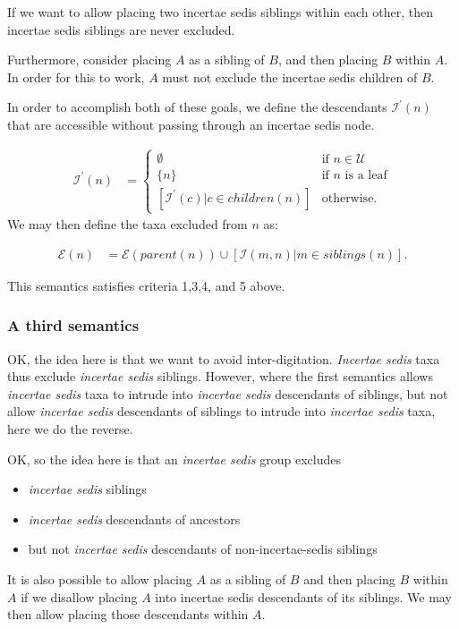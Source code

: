 \documentclass[english]{article}
\begin{document}
If we want to allow placing two incertae sedis siblings within each
other, then incertae sedis siblings are never excluded.

Furthermore, consider placing $A$ as a sibling of $B$, and then
placing $B$ within $A$.
In order for this to work, $A$ must not
exclude the incertae sedis children of $B$.

In order to accomplish both of these goals, we define the descendants
$\mathcal{I}^{\prime}(n)$ that are accessible without passing through
an incertae sedis node.

\begin{align*}
    \mathcal{I^{\prime}}(n) & =
    \begin{cases}
        \emptyset & \text{if }n\in\mathcal{U}\\
        \{n\} & \text{if }n\text{ is a leaf}\\
        [\mathcal{I}^{\prime}(c)|c\in children(n)] & \text{otherwise.}
\end{cases}
\end{align*} We may then define the taxa excluded from $n$
as:

\begin{align*} 
\mathcal{E}(n) & =\mathcal{E}(parent(n))\cup\left[\mathcal{I}(m,n)\big|m\in siblings(n)\right].\label{eq:exclude-set-formula-1}
\end{align*}

This semantics satisfies criteria 1,3,4, and 5 above.

\subsubsection{A third semantics}


OK, the idea here is that we want to avoid inter-digitation.
\emph{Incertae sedis} taxa thus exclude\emph{ incertae sedis}
siblings.
However, where the first semantics allows \emph{incertae
sedis }taxa to intrude into \emph{incertae sedis} descendants of
siblings, but not allow\emph{ incertae sedis} descendants of siblings
to intrude into \emph{incertae sedis} taxa, here we do the reverse.

OK, so the idea here is that an\emph{ incertae sedis} group excludes
\begin{itemize} \item \emph{incertae sedis} siblings \item
\emph{incertae sedis }descendants of ancestors \item but not\emph{
incertae sedis} descendants of non-incertae-sedis siblings
\end{itemize} It is also possible to allow placing $A$ as a sibling of
$B$ and then placing $B$ within $A$ if we disallow placing $A$ into
incertae sedis descendants of its siblings.
We may then allow placing
those descendants within $A$.
\end{document}
